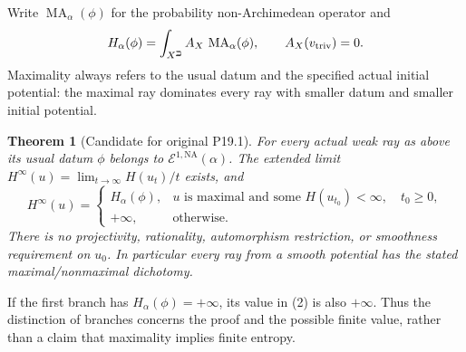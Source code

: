 \documentclass[11pt]{article}
\newcommand{\MA}{\operatorname{MA}}
\newcommand{\NA}{\mathrm{NA}}
\newtheorem{theorem}{Theorem}
\begin{document}
Write $\MA_\alpha(\phi)$ for the probability non-Archimedean operator
and
\[
 H_\alpha(\phi)=\int_{X^\beth}A_X\,\MA_\alpha(\phi),
 \qquad A_X(v_{\rm triv})=0.
\]
Maximality always refers to the usual datum and the specified actual
initial potential: the maximal ray dominates every ray with smaller
datum and smaller initial potential.

\begin{theorem}[Candidate for original P19.1]
For every actual weak ray as above its usual datum
$\phi$ belongs to $\mathcal E^{1,\NA}(\alpha)$. The extended limit
$H^\infty(u)=\lim_{t\to\infty}H(u_t)/t$ exists, and
\[
 H^\infty(u)=
 \begin{cases}
 H_\alpha(\phi),&u\text{ is maximal and some }H(u_{t_0})<\infty,
                    \quad t_0\geq0,\\
 +\infty,&\text{otherwise}.
 \end{cases}                                                \tag{2}
\]
There is no projectivity, rationality, automorphism restriction, or
smoothness requirement on $u_0$. In particular every ray from a smooth
potential has the stated maximal/nonmaximal dichotomy.
\end{theorem}
If the first branch has $H_\alpha(\phi)=+\infty$, its value in (2) is
also $+\infty$. Thus the distinction of branches concerns the proof
and the possible finite value, rather than a claim that maximality
implies finite entropy.
\end{document}
